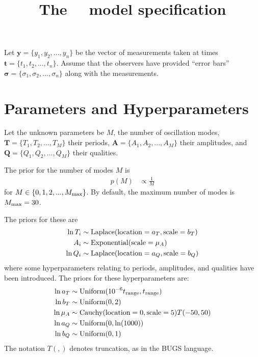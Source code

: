 \documentclass[a4paper, 12pt]{article}
\title{The~\Celery~ model specification}
\date{}
\newcommand{\Cauchy}{\textnormal{Cauchy}}
\newcommand{\Exponential}{\textnormal{Exponential}}
\newcommand{\Laplace}{\textnormal{Laplace}}
\newcommand{\location}{\textnormal{location}}
\newcommand{\scale}{\textnormal{scale}}
\newcommand{\Uniform}{\textnormal{Uniform}}
\begin{document}
\maketitle


\setlength{\parindent}{0pt}
\setlength{\parskip}{1em}

Let $\boldsymbol{y} = \{y_1, y_2, ..., y_n\}$ be the vector of measurements
taken at times $\boldsymbol{t} = \{t_1, t_2, ..., t_n\}$. Assume that the
observers have provided ``error bars''
$\boldsymbol{\sigma} = \{\sigma_1, \sigma_2, ..., \sigma_n\}$ along with the
measurements.

\section{Parameters and Hyperparameters}

Let the unknown parameters be $M$, the number of oscillation modes,
$\boldsymbol{T} = \{T_1, T_2, ..., T_M\}$ their periods,
$\boldsymbol{A} = \{A_1, A_2, ..., A_M\}$ their amplitudes,
and $\boldsymbol{Q} = \{Q_1, Q_2, ..., Q_M\}$ their qualities.

The prior for the number of modes $M$ is
\begin{align}
p(M) &\propto \frac{1}{M}
\end{align}
for $M \in \{0, 1, 2, ..., M_{\rm max}\}$. By default, the maximum number of
modes is $M_{\rm max} = 30$.

The priors for these are
\begin{align}
\ln T_i &\sim \Laplace(\location=a_T, \scale=b_T) \\
A_i &\sim \Exponential(\scale=\mu_A) \\
\ln Q_i &\sim \Laplace(\location=a_Q, \scale=b_Q)
\end{align}
where some hyperparameters relating to periods, amplitudes, and qualities
have been introduced. The priors for these hyperparameters are:
\begin{align}
\ln a_T   &\sim \Uniform(10^{-6}t_{\rm range}, t_{\rm range}) \\
\ln b_T   &\sim \Uniform(0, 2)\\
\ln \mu_A &\sim \Cauchy(\location=0, \scale=5)T(-50, 50) \\
\ln a_Q   &\sim \Uniform(0, \ln (1000)) \\
\ln b_Q   &\sim \Uniform(0, 1)
\end{align}
The notation $T(,)$ denotes truncation, as in the BUGS language.
\end{document}
